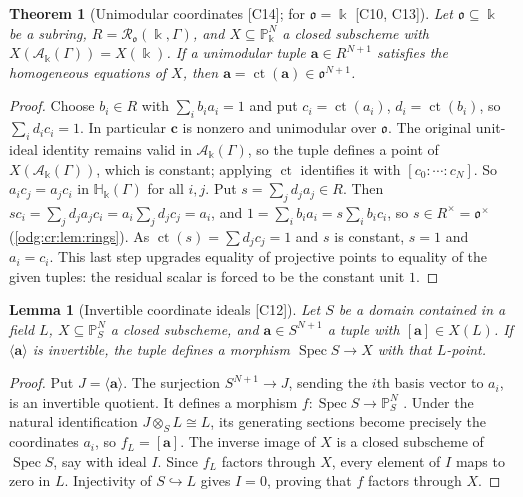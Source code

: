 \documentclass[11pt,oneside]{article}
\numberwithin{equation}{section}
\newtheorem{theorem}{Theorem}[section]
\newtheorem{lemma}[lemma]{Lemma}
\theoremstyle{definition}
\theoremstyle{remark}
\newcommand{\ct}{\operatorname{ct}}
\newcommand{\src}[1]{\textup{\textsf{\small[#1]}}}
\newcommand{\crH}{\mathbb H_\Bbbk(\Gamma)}
\newcommand{\crA}{\mathcal A_\Bbbk(\Gamma)}
\newcommand{\Spec}{\operatorname{Spec}}
\begin{document}
\begin{theorem}[Unimodular coordinates \src{C14}; for $\mathfrak o=\Bbbk$ \src{C10, C13}]\label{odg:cr:thm:unimodular}
Let $\mathfrak o\subseteq\Bbbk$ be a subring, $R=\mathcal R_{\mathfrak o}(\Bbbk,\Gamma)$,
and $X\subseteq\mathbb P^N_\Bbbk$ a closed subscheme with $X(\crA)=X(\Bbbk)$. If a
unimodular tuple $\mathbf a\in R^{N+1}$ satisfies the homogeneous equations of $X$,
then $\mathbf a=\ct(\mathbf a)\in\mathfrak o^{N+1}$.
\end{theorem}
\begin{proof}
Choose $b_i\in R$ with $\sum_ib_ia_i=1$ and put $c_i=\ct(a_i)$, $d_i=\ct(b_i)$, so
$\sum_id_ic_i=1$. In particular $\mathbf c$ is nonzero and unimodular over
$\mathfrak o$. The original unit-ideal identity remains valid in $\crA$, so
the tuple defines a point of $X(\crA)$, which is
constant; applying $\ct$ identifies it with $[c_0:\cdots:c_N]$. So
$a_ic_j=a_jc_i$ in $\crH$ for all $i,j$. Put $s=\sum_jd_ja_j\in R$. Then
$sc_i=\sum_jd_ja_jc_i=a_i\sum_jd_jc_j=a_i$, and $1=\sum_ib_ia_i=s\sum_ib_ic_i$, so
$s\in R^\times=\mathfrak o^\times$ (\cref{odg:cr:lem:rings}). As $\ct(s)=\sum d_jc_j=1$
and $s$ is constant, $s=1$ and $a_i=c_i$. This last step upgrades equality of
projective points to equality of the given tuples: the residual scalar is
forced to be the constant unit $1$.
\end{proof}

\begin{lemma}[Invertible coordinate ideals \src{C12}]\label{odg:cr:lem:coordinatepoint}
Let $S$ be a domain contained in a field $L$, $X\subseteq\mathbb P^N_S$ a closed
subscheme, and $\mathbf a\in S^{N+1}$ a tuple with $[\mathbf a]\in X(L)$. If
$\langle\mathbf a\rangle$ is invertible, the tuple defines a morphism
$\Spec S\to X$ with that $L$-point.
\end{lemma}
\begin{proof}
Put $J=\langle\mathbf a\rangle$. The surjection $S^{N+1}\to J$, sending the
$i$th basis vector to $a_i$, is an invertible quotient. It defines a morphism
$f:\Spec S\to\mathbb P^N_S$ \cite[Tag 01ND]{StacksProjSpace}. Under the natural
identification $J\otimes_S L\cong L$, its generating sections become precisely
the coordinates $a_i$, so $f_L=[\mathbf a]$. The inverse image of $X$ is a
closed subscheme of $\Spec S$, say with ideal $I$. Since $f_L$ factors through
$X$, every element of $I$ maps to zero in $L$. Injectivity of $S\hookrightarrow L$
gives $I=0$, proving that $f$ factors through $X$.
\end{proof}
\end{document}
